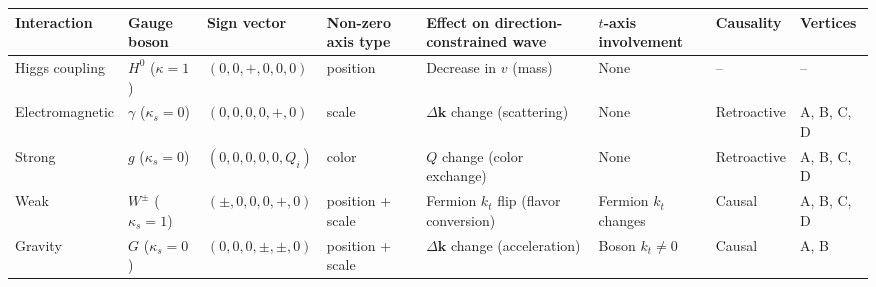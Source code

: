 \documentclass[
  a4paper,11pt]{article}
\newcounter{none}
\theoremstyle{definition}
\theoremstyle{remark}
\begin{document}
{\def\LTcaptype{none} %
\begin{longtable}[]{@{}
  >{\raggedright\arraybackslash}p{}
  >{\raggedright\arraybackslash}p{}
  >{\raggedright\arraybackslash}p{}
  >{\raggedright\arraybackslash}p{}
  >{\raggedright\arraybackslash}p{}
  >{\raggedright\arraybackslash}p{}
  >{\raggedright\arraybackslash}p{}
  >{\raggedright\arraybackslash}p{}@{}}
\toprule\noalign{}
\begin{minipage}[b]{\linewidth}\raggedright
Interaction
\end{minipage} & \begin{minipage}[b]{\linewidth}\raggedright
Gauge boson
\end{minipage} & \begin{minipage}[b]{\linewidth}\raggedright
Sign vector
\end{minipage} & \begin{minipage}[b]{\linewidth}\raggedright
Non-zero axis type
\end{minipage} & \begin{minipage}[b]{\linewidth}\raggedright
Effect on direction-constrained wave
\end{minipage} & \begin{minipage}[b]{\linewidth}\raggedright
\(t\)-axis involvement
\end{minipage} & \begin{minipage}[b]{\linewidth}\raggedright
Causality
\end{minipage} & \begin{minipage}[b]{\linewidth}\raggedright
Vertices
\end{minipage} \\
\midrule\noalign{}
\endhead
\bottomrule\noalign{}
\endlastfoot
Higgs coupling & \(H^0\) (\(\kappa=1\)) & \((0,0,+,0,0,0)\) & position &
Decrease in \(v\) (mass) & None & -- & -- \\
Electromagnetic & \(\gamma\) (\(\kappa_s=0\)) & \((0,0,0,0,+,0)\) &
scale & \(\Delta\mathbf{k}\) change (scattering) & None & Retroactive &
A, B, C, D \\
Strong & \(g\) (\(\kappa_s=0\)) & \((0,0,0,0,0,Q_i)\) & color & \(Q\)
change (color exchange) & None & Retroactive & A, B, C, D \\
Weak & \(W^{\pm}\) (\(\kappa_s=1\)) & \((\pm,0,0,0,+,0)\) & position +
scale & Fermion \(k_t\) flip (flavor conversion) & Fermion \(k_t\)
changes & Causal & A, B, C, D \\
Gravity & \(G\) (\(\kappa_s=0\)) & \((0,0,0,\pm,\pm,0)\) & position +
scale & \(\Delta\mathbf{k}\) change (acceleration) & Boson
\(k_t \neq 0\) & Causal & A, B \\
\end{longtable}
}
\end{document}
